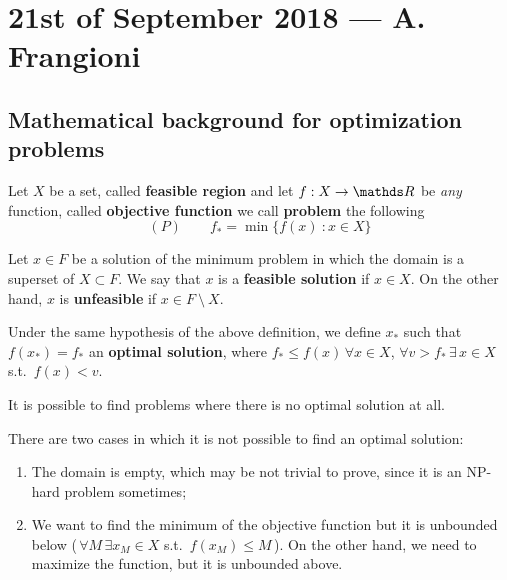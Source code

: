 \documentclass[computational_mathematics.tex]{subfiles}
\begin{document}
\section{21st of September 2018 --- A. Frangioni}

\subsection{Mathematical background for optimization problems}

\begin{definition}\label{def:min_prob}
  Let $X$ be a set, called \textbf{feasible region} and let $f : X \to \R$ be \emph{any} function, called \textbf{objective function} we call \textbf{problem} the following
\[
  (P) \qquad f_* = \min \{f(x)~:x \in X\}
\]
\end{definition}


\begin{definition}
  Let $x \in F$ be a solution of the minimum problem in which the domain is a superset of $X \subset F$. 
  We say that $x$ is a \textbf{feasible solution} if $x \in X$.
  On the other hand, $x$ is \textbf{unfeasible} if $x \in F~\setminus~X$.
\end{definition}

\begin{definition}
  Under the same hypothesis of the above definition, we define $x_*$ such that $f(x_*) = f_*$ an \textbf{optimal solution}, where $f_* \leq f(x) \, \forall x \in X$, $\forall v > f_* \, \exists \, x \in X$ s.t.~$f(x) < v$.
\end{definition}

It is possible to find problems where there is no optimal solution at all.

\begin{example}
  There are two cases in which it is not possible to find an optimal solution:
  \begin{enumerate}
    \item The domain is empty, which may be not trivial to prove, since it is an NP-hard problem sometimes;
    \item We want to find the minimum of the objective function but it is unbounded below (\,$\forall M \, \exists x_M \in X$
      s.t.~$f(x_M) \leq M$\,).
      On the other hand, we need to maximize the function, but it is unbounded above.
  \end{enumerate}
\end{example}
\end{document}
